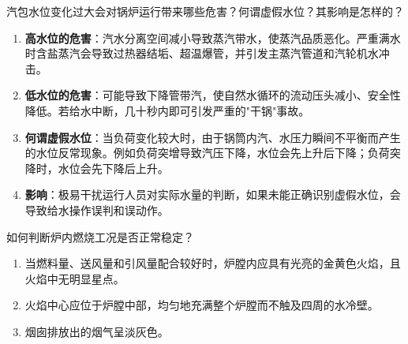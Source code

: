 \begin{problem}
汽包水位变化过大会对锅炉运行带来哪些危害？何谓虚假水位？其影响是怎样的？
\end{problem}

\begin{solution}
\begin{enumerate}
  \item \textbf{高水位的危害}：汽水分离空间减小导致蒸汽带水，使蒸汽品质恶化。严重满水时含盐蒸汽会导致过热器结垢、超温爆管，并引发主蒸汽管道和汽轮机水冲击。
  \item \textbf{低水位的危害}：可能导致下降管带汽，使自然水循环的流动压头减小、安全性降低。若给水中断，几十秒内即可引发严重的"干锅"事故。
  \item \textbf{何谓虚假水位}：当负荷变化较大时，由于锅筒内汽、水压力瞬间不平衡而产生的水位反常现象。例如负荷突增导致汽压下降，水位会先上升后下降；负荷突降时，水位会先下降后上升。
  \item \textbf{影响}：极易干扰运行人员对实际水量的判断，如果未能正确识别虚假水位，会导致给水操作误判和误动作。
\end{enumerate}
\end{solution}

\begin{problem}
如何判断炉内燃烧工况是否正常稳定？
\end{problem}

\begin{solution}
\begin{enumerate}
  \item 当燃料量、送风量和引风量配合较好时，炉膛内应具有光亮的金黄色火焰，且火焰中无明显星点。
  \item 火焰中心应位于炉膛中部，均匀地充满整个炉膛而不触及四周的水冷壁。
  \item 烟囱排放出的烟气呈淡灰色。
\end{enumerate}
\end{solution}
